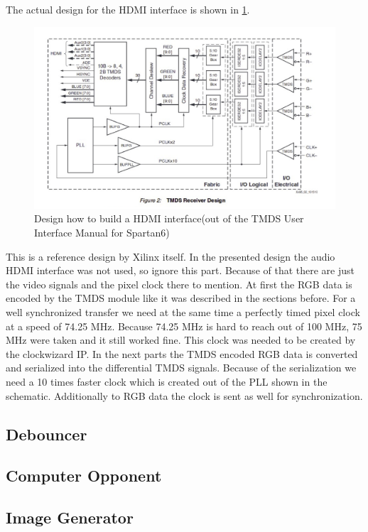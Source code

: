 The actual design for the HDMI interface is shown in \ref{hdmi_design}. 
\begin{figure}[h]
	\centering
	\includegraphics[scale=0.7]{images/hdmi_design.png}

\caption{Design how to build a HDMI interface(out of the TMDS User Interface Manual for Spartan6)}
\label{hdmi_design}
\end{figure}
This is a reference design by Xilinx itself. In the presented design the audio HDMI interface was not used, so ignore this part. Because of that there are just the video signals and the pixel clock there to mention. At first the RGB data is encoded by the TMDS module like it was described in the sections before. For a well synchronized transfer we need at the same time a perfectly timed pixel clock at a speed of 74.25 MHz. Because 74.25 MHz is hard to reach out of 100 MHz, 75 MHz were taken and it still worked fine. This clock was needed to be created by the clockwizard IP. In the next parts the TMDS encoded RGB data is converted and serialized into the differential TMDS signals. Because of the serialization we need a 10 times faster clock which is created out of the PLL shown in the schematic. Additionally to RGB data the clock is sent as well for synchronization.


    \subsection{Debouncer}
    \subsection{Computer Opponent}
    \subsection{Image Generator}
    
